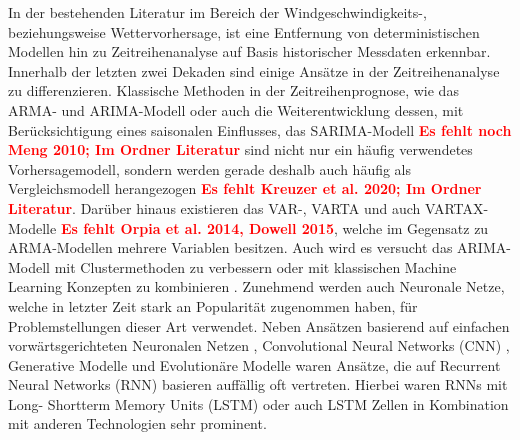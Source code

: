 \documentclass[
12pt, %
toc=listofnumbered, %
toc=chapterentrydotfill, %
numbers=noenddot, %
captions=tableheading, %
bibliography=numbered
]{scrreprt}
\newcommand{\highlight}[1]{\textbf{\textcolor{red}{#1}}}
\begin{document}
In der bestehenden Literatur im Bereich der Windgeschwindigkeits-, beziehungsweise Wettervorhersage, ist eine Entfernung von 
deterministischen Modellen \cite{1963_Lorenz_DeterministicNonperiodicFlow} hin zu Zeitreihenanalyse auf Basis historischer Messdaten erkennbar. 
Innerhalb der letzten zwei Dekaden sind einige Ansätze in der Zeitreihenanalyse zu differenzieren. Klassische Methoden in der 
Zeitreihenprognose, wie das ARMA- und ARIMA-Modell \cite{2016_Cadenas_WindSpeedPrediction} oder auch 
die Weiterentwicklung dessen, mit Berücksichtigung eines saisonalen Einflusses, das SARIMA-Modell 
\highlight{Es fehlt noch Meng 2010; Im Ordner Literatur}\cite{2018_Alencar_HybridApproachCombining,2019_TenaGarcia_ForecastDailyOutput,2019_Haddad_WindSolarForecasting,2002_Igboekwe_StochasticSimulationHourly,2012_MuhammadSami_PredictionRateDust} sind 
nicht nur ein häufig verwendetes Vorhersagemodell, sondern werden gerade deshalb auch häufig als Vergleichsmodell herangezogen 
\highlight{Es fehlt Kreuzer et al. 2020; Im Ordner Literatur}\cite{2012_Cao_ForecastingWindSpeed,2019_Chen_MultifactorSpatiotemporalCorrelation}. Darüber hinaus existieren das VAR-, VARTA und auch VARTAX-Modelle 
\highlight{Es fehlt Orpia et al. 2014, Dowell 2015}\cite{2007_Ewing_TimeSeriesAnalysis,2015_He_SparsifiedVectorAutoregressive,2016_Koivisto_WindSpeedModeling}, 
welche im Gegensatz zu ARMA-Modellen mehrere Variablen besitzen. Auch wird es versucht das ARIMA-Modell mit Clustermethoden 
zu verbessern oder mit klassischen Machine Learning Konzepten zu kombinieren \cite{2017_Zhang_HybridMethodShortTerm,2011_Guo_CorrectedHybridApproach}. 
Zunehmend werden auch Neuronale Netze, welche in letzter Zeit stark an Popularität zugenommen haben, für Problemstellungen dieser 
Art verwendet. Neben Ansätzen basierend auf einfachen vorwärtsgerichteten Neuronalen Netzen \cite{2019_Samet_EvaluationNeuralNetworkbased,2017_Chang_ImprovedNeuralNetworkbased}, Convolutional Neural Networks (CNN) \cite{2020_Zhao_ShorttermAverageWind,2019_Chen_MultifactorSpatiotemporalCorrelation},  
Generative Modelle \cite{2019_Khodayar_IntervalDeepGenerative} und Evolutionäre Modelle \cite{2012_Wang_ShorttermWindSpeed} 
waren Ansätze, die auf Recurrent Neural Networks (RNN) basieren auffällig oft vertreten. Hierbei waren RNNs mit Long- Shortterm Memory Units (LSTM) \cite{2018_Dong_WindPowerPrediction,2020_Delgado_WindTurbineData,2020_Moharm_WindSpeedForecast,2019_Prabha_WindSpeedForecasting,2019_Cali_ShorttermWindPower} oder auch LSTM Zellen in Kombination mit 
anderen Technologien \cite{2019_Chen_MultifactorSpatiotemporalCorrelation,2016_Allende_RecurrentNetworksWind,2018_Liu_WindSpeedForecasting,2018_Yao_MultidimensionalLSTMNetworks} sehr prominent.
\end{document}
